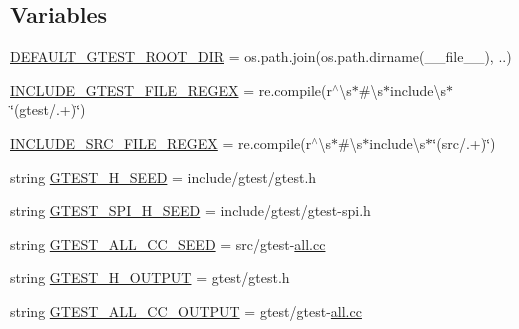 \subsection*{Variables}
\begin{DoxyCompactItemize}
\item 
\hyperlink{namespacefuse__gtest__files_a68085bdb2912baa7e71d2b3eb37b05c9}{D\+E\+F\+A\+U\+L\+T\+\_\+\+G\+T\+E\+S\+T\+\_\+\+R\+O\+O\+T\+\_\+\+D\+IR} = os.\+path.\+join(os.\+path.\+dirname(\+\_\+\+\_\+file\+\_\+\+\_\+), \textquotesingle{}..\textquotesingle{})
\item 
\hyperlink{namespacefuse__gtest__files_ad7abe9bfa06bb1c5411e8b4a7a686e5b}{I\+N\+C\+L\+U\+D\+E\+\_\+\+G\+T\+E\+S\+T\+\_\+\+F\+I\+L\+E\+\_\+\+R\+E\+G\+EX} = re.\+compile(r\textquotesingle{}$^\wedge$\textbackslash{}s$\ast$\#\textbackslash{}s$\ast$include\textbackslash{}s$\ast$\char`\"{}(gtest/.+)\char`\"{}\textquotesingle{})
\item 
\hyperlink{namespacefuse__gtest__files_aec4e054d0ab27276d6150468bb98a8a4}{I\+N\+C\+L\+U\+D\+E\+\_\+\+S\+R\+C\+\_\+\+F\+I\+L\+E\+\_\+\+R\+E\+G\+EX} = re.\+compile(r\textquotesingle{}$^\wedge$\textbackslash{}s$\ast$\#\textbackslash{}s$\ast$include\textbackslash{}s$\ast$\char`\"{}(src/.+)\char`\"{}\textquotesingle{})
\item 
string \hyperlink{namespacefuse__gtest__files_ad897bce28100f2b97216929013519181}{G\+T\+E\+S\+T\+\_\+\+H\+\_\+\+S\+E\+ED} = \textquotesingle{}include/gtest/gtest.\+h\textquotesingle{}
\item 
string \hyperlink{namespacefuse__gtest__files_a891d03ce9cfe3577cb4c193f9544f17f}{G\+T\+E\+S\+T\+\_\+\+S\+P\+I\+\_\+\+H\+\_\+\+S\+E\+ED} = \textquotesingle{}include/gtest/gtest-\/spi.\+h\textquotesingle{}
\item 
string \hyperlink{namespacefuse__gtest__files_a162a6031d0d5743a37a4f79227d5e916}{G\+T\+E\+S\+T\+\_\+\+A\+L\+L\+\_\+\+C\+C\+\_\+\+S\+E\+ED} = \textquotesingle{}src/gtest-\/\hyperlink{gtest__output__test__golden__lin_8txt_a36ebfe06d2a8523cebd158fbc62be565}{all.\+cc}\textquotesingle{}
\item 
string \hyperlink{namespacefuse__gtest__files_a16437f87d0f7a9800885a9082a0b773e}{G\+T\+E\+S\+T\+\_\+\+H\+\_\+\+O\+U\+T\+P\+UT} = \textquotesingle{}gtest/gtest.\+h\textquotesingle{}
\item 
string \hyperlink{namespacefuse__gtest__files_aa66c14474599109c46ec24eaa0ad4217}{G\+T\+E\+S\+T\+\_\+\+A\+L\+L\+\_\+\+C\+C\+\_\+\+O\+U\+T\+P\+UT} = \textquotesingle{}gtest/gtest-\/\hyperlink{gtest__output__test__golden__lin_8txt_a36ebfe06d2a8523cebd158fbc62be565}{all.\+cc}\textquotesingle{}
\end{DoxyCompactItemize}



